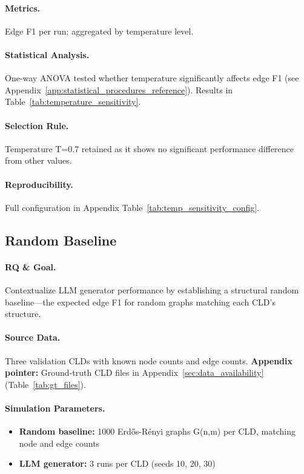 \paragraph{Metrics.}
Edge F1 per run; aggregated by temperature level.

\paragraph{Statistical Analysis.}
One-way ANOVA tested whether temperature significantly affects edge F1 (see Appendix~\ref{app:statistical_procedures_reference}). Results in Table~\ref{tab:temperature_sensitivity}.

\paragraph{Selection Rule.}
Temperature T=0.7 retained as it shows no significant performance difference from other values.

\paragraph{Reproducibility.}
Full configuration in Appendix Table~\ref{tab:temp_sensitivity_config}.

\subsection{Random Baseline}
\label{sec:random_baseline_method}

\paragraph{RQ \& Goal.}
Contextualize LLM generator performance by establishing a structural random baseline---the expected edge F1 for random graphs matching each CLD's structure.

\paragraph{Source Data.}
Three validation CLDs with known node counts and edge counts.
\textbf{Appendix pointer:} Ground-truth CLD files in Appendix~\ref{sec:data_availability} (Table~\ref{tab:gt_files}).

\paragraph{Simulation Parameters.}
\begin{itemize}[noitemsep]
    \item \textbf{Random baseline:} 1000 Erd\H{o}s-R\'enyi graphs G(n,m) per CLD, matching node and edge counts
    \item \textbf{LLM generator:} 3 runs per CLD (seeds 10, 20, 30)
\end{itemize}

